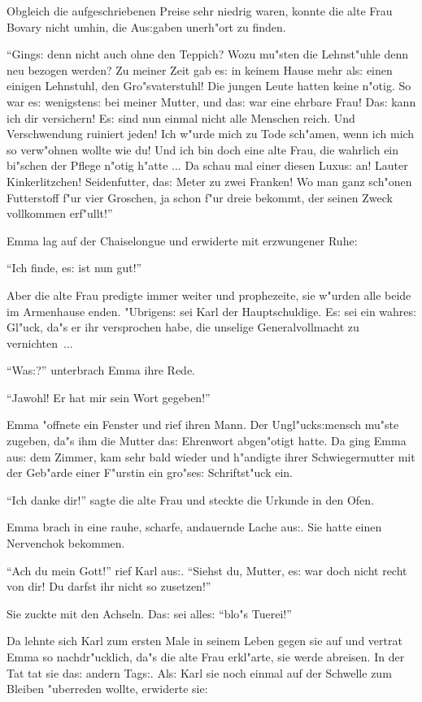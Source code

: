 \documentclass[oneside,12pt]{book}
\newcommand{\s}{s:}%
\begin{document}
Obgleich die aufgeschriebenen Preise sehr niedrig waren, konnte
die alte Frau Bovary nicht umhin, die Au{\s}gaben unerh"ort zu
finden.

"`Ging{\s} denn nicht auch ohne den Teppich? Wozu mu"sten die
Lehnst"uhle denn neu bezogen werden? Zu meiner Zeit gab e{\s} in
keinem Hause mehr al{\s} einen einigen Lehnstuhl, den
Gro"svaterstuhl! Die jungen Leute hatten keine n"otig. So war
e{\s} wenigsten{\s} bei meiner Mutter, und da{\s} war eine ehrbare
Frau! Da{\s} kann ich dir versichern! E{\s} sind nun einmal nicht
alle Menschen reich. Und Verschwendung ruiniert jeden! Ich w"urde
mich zu Tode sch"amen, wenn ich mich so verw"ohnen wollte wie du!
Und ich bin doch eine alte Frau, die wahrlich ein bi"schen der
Pflege n"otig h"atte ... Da schau mal einer diesen Luxu{\s} an!
Lauter Kinkerlitzchen! Seidenfutter, da{\s} Meter zu zwei Franken!
Wo man ganz sch"onen Futterstoff f"ur vier Groschen, ja schon f"ur
dreie bekommt, der seinen Zweck vollkommen erf"ullt!"'

Emma lag auf der Chaiselongue und erwiderte mit erzwungener Ruhe:

"`Ich finde, e{\s} ist nun gut!"'

Aber die alte Frau predigte immer weiter und prophezeite, sie
w"urden alle beide im Armenhause enden. "Ubrigen{\s} sei Karl der
Hauptschuldige. E{\s} sei ein wahre{\s} Gl"uck, da"s er ihr
versprochen habe, die unselige Generalvollmacht zu vernichten~...

"`Wa{\s}?"' unterbrach Emma ihre Rede.

"`Jawohl! Er hat mir sein Wort gegeben!"'

Emma "offnete ein Fenster und rief ihren Mann. Der
Ungl"uck{\s}mensch mu"ste zugeben, da"s ihm die Mutter da{\s}
Ehrenwort abgen"otigt hatte. Da ging Emma au{\s} dem Zimmer, kam
sehr bald wieder und h"andigte ihrer Schwiegermutter mit der
Geb"arde einer F"urstin ein gro"se{\s} Schriftst"uck ein.

"`Ich danke dir!"' sagte die alte Frau und steckte die Urkunde in
den Ofen.

Emma brach in eine rauhe, scharfe, andauernde Lache au{\s}. Sie
hatte einen Nervenchok bekommen.

"`Ach du mein Gott!"' rief Karl au{\s}. "`Siehst du, Mutter, e{\s}
war doch nicht recht von dir! Du darfst ihr nicht so zusetzen!"'

Sie zuckte mit den Achseln. Da{\s} sei alle{\s} "`blo"s Tuerei!"'

Da lehnte sich Karl zum ersten Male in seinem Leben gegen sie auf
und vertrat Emma so nachdr"ucklich, da"s die alte Frau erkl"arte,
sie werde abreisen. In der Tat tat sie da{\s} andern Tag{\s}.
Al{\s} Karl sie noch einmal auf der Schwelle zum Bleiben
"uberreden wollte, erwiderte sie:
\end{document}
